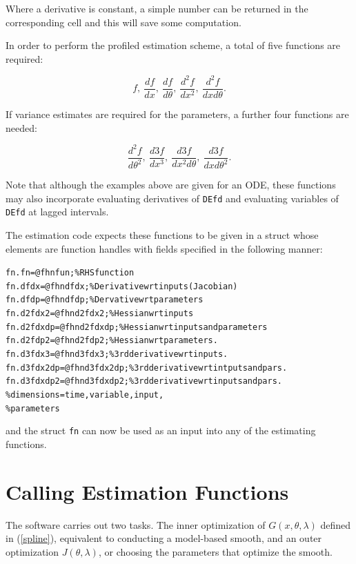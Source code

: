 \documentclass{article}
\newcommand{\nt}    {\noindent}
\begin{document}
\nt Where a derivative is constant, a simple number can be returned in
the corresponding cell and this will save some computation.

In order to perform the profiled estimation scheme, a total of five
functions are required:

\[ f, \ \frac{df}{dx}, \ \frac{df}{d\theta}, \ \frac{d^2f}{dx^2}, \
\frac{d^2f}{dxd\theta}. \]

\nt If variance estimates are required for the parameters, a further
four functions are needed:

\[ \frac{d^2f}{d\theta^2}, \ \frac{d3f}{dx^3}, \ \frac{d3f}{dx^2d\theta}, \
\frac{d3f}{dxd\theta^2}. \]

Note that although the examples above are given for an ODE, these functions may also incorporate
evaluating derivatives of {\tt DEfd} and evaluating variables of {\tt DEfd} at lagged intervals.

The estimation code expects these functions to be given
in a struct whose elements are function handles with fields specified
in the following manner:

\begin{alltt}
   fn.fn       = @fhnfun;       \% RHS function
   fn.dfdx     = @fhndfdx;      \% Derivative wrt inputs (Jacobian)
   fn.dfdp     = @fhndfdp;      \% Dervative wrt parameters
   fn.d2fdx2   = @fhnd2fdx2;    \% Hessian wrt inputs
   fn.d2fdxdp  = @fhnd2fdxdp;   \% Hessian wrt inputs and parameters
   fn.d2fdp2   = @fhnd2fdp2;    \% Hessian wrt parameters.
   fn.d3fdx3   = @fhnd3fdx3;    \% 3rd derivative wrt inputs.
   fn.d3fdx2dp = @fhnd3fdx2dp;  \% 3rd derivative wrt intputs and pars.
   fn.d3fdxdp2 = @fhnd3fdxdp2;  \% 3rd derivative wrt inputs and pars.
                                \% dimensions = time, variable, input,
                                \% parameters
\end{alltt}

\nt and the struct {\tt fn} can now be used as an input
into any of the estimating functions.


\section{Calling Estimation Functions}  \label{estimation}

The software carries out two tasks. The inner optimization of $G(x,\theta,\lambda)$ defined in
(\ref{spline}), equivalent to conducting a model-based smooth, and an outer optimization
$J(\theta,\lambda)$, or choosing the parameters that optimize the smooth.
\end{document}
